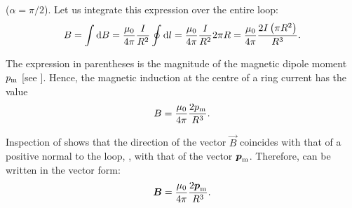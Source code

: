 \noindent
($\alpha=\pi/2$). Let us integrate this expression over the entire loop:
\begin{equation*}
    B = \int \mathrm{d} B = \frac{\mu_0}{4\pi} \frac{I}{R^2} \oint \mathrm{d} l = \frac{\mu_0}{4\pi} \frac{I}{R^2} 2\pi R = \frac{\mu_0}{4\pi} \frac{2I \left(\pi R^2\right)}{R^3}.
\end{equation*}

The expression in parentheses is the magnitude of the magnetic dipole moment $p_{\text{m}}$ [see ]. Hence, the magnetic induction at the centre of a ring current has the value
\begin{equation}\label{eq:6_78}
    B = \frac{\mu_0}{4\pi} \frac{2p_{\text{m}}}{R^3}.
\end{equation}

Inspection of  shows that the direction of the vector $\vec{B}$ coincides with that of a positive normal to the loop, \ie, with that of the vector $\boldsymbol{p}_{\text{m}}$. Therefore,  can be written in the vector form:
\begin{equation}\label{eq:6_79}
    \boldsymbol{B} = \frac{\mu_0}{4\pi} \frac{2\boldsymbol{p}_{\text{m}}}{R^3}.
\end{equation}

